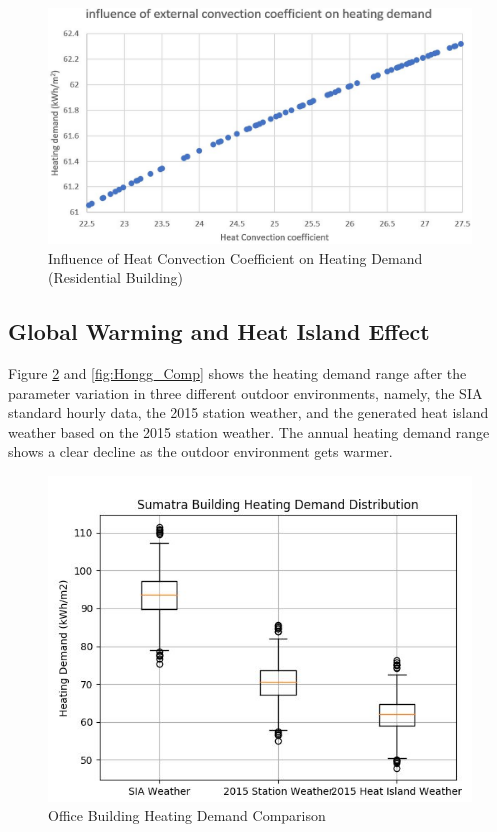 \documentclass[a4paper, oneside]{discothesis}
\begin{document}
          	\begin{figure}[htbp]
    		\centering
    		\includegraphics[scale=0.5]{Hongg_ConvCoe.JPG}
    		\caption{Influence of Heat Convection Coefficient on Heating Demand (Residential Building)}
    		\label{fig:Hongg_convcoef}
    		\end{figure}
        
        \subsection{Global Warming and Heat Island Effect}
		Figure \ref{fig:Sumatra_Comp} and \ref{fig:Hongg_Comp} shows the heating demand range after the parameter variation in three different outdoor environments, namely, the SIA standard hourly data, the 2015 station weather, and the generated heat island weather based on the 2015 station weather. The annual heating demand range shows a clear decline as the outdoor environment gets warmer.

	    \begin{figure}[H]
		\centering
		\includegraphics[scale=0.63]{Sumatra_Comparison.jpg}
		\caption{Office Building Heating Demand Comparison}
		\label{fig:Sumatra_Comp}
		\end{figure}
\end{document}

